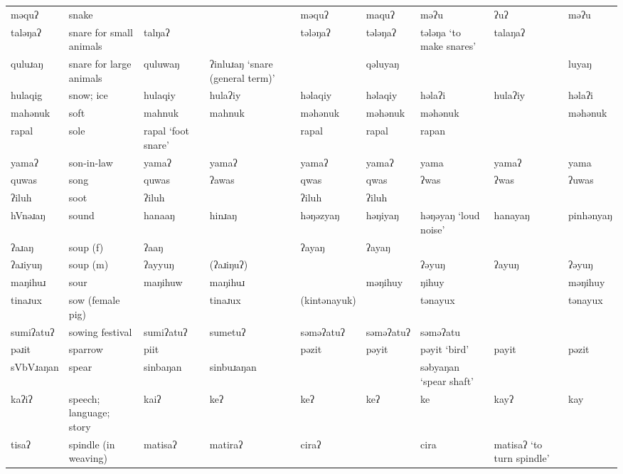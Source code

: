 \begin{landscape}
\begin{longtable}{*{9}{>{\raggedright\arraybackslash}p{}}}
\text{*}məquʔ        & snake &  &  & məquʔ & maquʔ & məʔu & ʔuʔ & məʔu\\
\text{*}taləŋaʔ      & snare for small animals & talŋaʔ &  & tələŋaʔ & tələŋaʔ & tələŋa `to make snares' & talaŋaʔ & \\
\text{*}quluɹaŋ      & snare for large animals & quluwaŋ & ʔinluɹaŋ `snare (general term)' &  & qəluyaŋ &  &  & luyaŋ\\
\text{*}hulaqig      & snow; ice & hulaqiy & hulaʔiy & həlaqiy & həlaqiy & həlaʔi & hulaʔiy & həlaʔi\\
\text{*}mahənuk      & soft & mahnuk & mahnuk & məhənuk & məhənuk & məhənuk &  & məhənuk\\
\text{*}rapal        & sole & rapal \newline `foot snare' &  & rapal & rapal & rapan &  & \\
\text{*}yamaʔ        & son-in-law & yamaʔ & yamaʔ & yamaʔ & yamaʔ & yama & yamaʔ & yama\\
\text{*}quwas        & song & quwas & ʔawas & qwas & qwas & ʔwas & ʔwas & ʔuwas\\
\text{*}ʔiluh        & soot & ʔiluh &  & ʔiluh & ʔiluh &  &  & \\
\text{*}hVnəɹaŋ      & sound & hanaaŋ & hinɹaŋ & həŋəzyaŋ & həŋiyaŋ & həŋəyaŋ \newline `loud noise' & hanayaŋ & pinhənyaŋ\\
\text{*}ʔaɹaŋ        & soup (f) & ʔaaŋ &  & ʔayaŋ & ʔayaŋ &  &  & \\
\text{*}ʔaɹiyuŋ      & soup (m) & ʔayyuŋ & (ʔaɹiŋuʔ) &  &  & ʔəyuŋ & ʔayuŋ & ʔəyuŋ\\
\text{*}maŋihuɹ      & sour & maŋihuw & maŋihuɹ &  & məŋihuy & ŋihuy &  & məŋihuy\\
\text{*}tinaɹux      & sow (female pig) &  & tinaɹux & (kintənayuk) &  & tənayux &  & tənayux\\
\text{*}sumiʔatuʔ    & sowing festival & sumiʔatuʔ & sumetuʔ & səməʔatuʔ & səməʔatuʔ & səməʔatu &  & \\
\text{*}pəɹit        & sparrow & piit &  & pəzit & pəyit & pəyit `bird' & payit & pəzit\\
\text{*}sVbVɹaŋan    & spear & sinbaŋan & sinbuɹaŋan &  &  & səbyaŋan `spear shaft' &  & \\
\text{*}kaʔiʔ        & speech; language; story & kaiʔ & keʔ & keʔ & keʔ & ke & kayʔ & kay\\
\text{*}tisaʔ        & spindle (in weaving) & matisaʔ & matiraʔ & ciraʔ &  & cira & matisaʔ `to turn spindle' & \\

\end{longtable}
\end{landscape}
